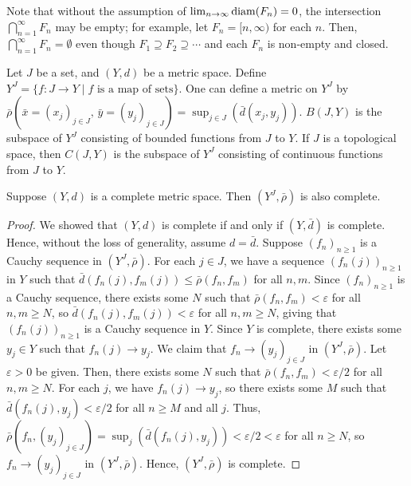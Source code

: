 Note that without the assumption of $\lim_{n \to \infty} \operatorname{diam}(F_{n}) = 0$, the intersection $\bigcap_{n=1}^{\infty} F_{n}$ may be empty; for example, let $F_{n} = [n,\infty)$ for each $n$. Then, $\bigcap_{n=1}^{\infty} F_{n} = \emptyset$ even though $F_{1} \supseteq F_{2} \supseteq \cdots$ and each $F_{n}$ is non-empty and closed.

\begin{definition}
    Let $J$ be a set, and $(Y,d)$ be a metric space. Define $Y^{J} = \{f: J \to Y \mid f \text{ is a map of sets}\}$. One can define a metric on $Y^{J}$ by $\bar{\rho}(\bar{x}=(x_{j})_{j \in J}, \, \bar{y}=(y_{j})_{j \in J}) = \sup_{j \in J} (\bar{d}(x_{j},y_{j}))$. $B(J,Y)$ is the subspace of $Y^{J}$ consisting of bounded functions from $J$ to $Y$. If $J$ is a topological space, then $C(J,Y)$ is the subspace of $Y^{J}$ consisting of continuous functions from $J$ to $Y$.
\end{definition}

\begin{proposition}
    Suppose $(Y,d)$ is a complete metric space. Then $(Y^{J},\bar{\rho})$ is also complete.
\end{proposition}

\begin{proof}
    We showed that $(Y,d)$ is complete if and only if $(Y,\bar{d})$ is complete. Hence, without the loss of generality, assume $d = \bar{d}$. Suppose $(f_{n})_{n \geq 1}$ is a Cauchy sequence in $(Y^{J},\bar{\rho})$. For each $j \in J$, we have a sequence $(f_{n}(j))_{n \geq 1}$ in $Y$ such that $\bar{d}(f_{n}(j),f_{m}(j)) \leq \bar{\rho}(f_{n},f_{m})$ for all $n,m$. Since $(f_{n})_{n \geq 1}$ is a Cauchy sequence, there exists some $N$ such that $\bar{\rho}(f_{n},f_{m}) < \varepsilon$ for all $n,m \geq N$, so $\bar{d}(f_{n}(j),f_{m}(j)) < \varepsilon$ for all $n,m \geq N$, giving that $(f_{n}(j))_{n \geq 1}$ is a Cauchy sequence in $Y$. Since $Y$ is complete, there exists some $y_{j} \in Y$ such that $f_{n}(j) \to y_{j}$. We claim that $f_{n} \to (y_{j})_{j \in J}$ in $(Y^{J},\bar{\rho})$. Let $\varepsilon > 0$ be given. Then, there exists some $N$ such that $\bar{\rho}(f_{n},f_{m}) < \varepsilon/2$ for all $n,m \geq N$. For each $j$, we have $f_{n}(j) \to y_{j}$, so there exists some $M$ such that $\bar{d}(f_{n}(j),y_{j}) < \varepsilon/2$ for all $n \geq M$ and all $j$. Thus, $\bar{\rho}(f_{n},(y_{j})_{j \in J}) = \sup_{j} (\bar{d}(f_{n}(j),y_{j})) < \varepsilon/2 < \varepsilon$ for all $n \geq N$, so $f_{n} \to (y_{j})_{j \in J}$ in $(Y^{J},\bar{\rho})$. Hence, $(Y^{J},\bar{\rho})$ is complete.
\end{proof}

